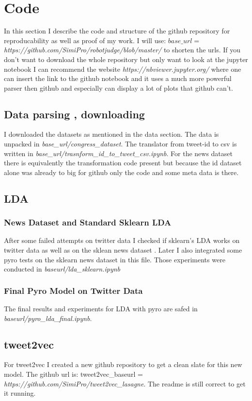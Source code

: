\documentclass[10pt,conference,compsocconf]{IEEEtran}
\begin{document}
\section{Code}
\label{sec:Code}
In this section I describe the code and structure of the github repository for reproducability as well as proof of my work. I will use: $base\_url =$ \textit{https://github.com/SimiPro/robotjudge/blob/master/} to shorten the urls. If you don't want to download the whole repository but only want to look at the jupyter notebook I can recommend the website \textit{https://nbviewer.jupyter.org/} where one can insert the link to the github notebook and it uses a much more powerful parser then github and especially can display a lot of plots that github can't.

\subsection{Data parsing , downloading}
I downloaded the datasets as mentioned in the data section. The data is unpacked in \textit{base\_url/congress\_dataset}. The translator from tweet-id to csv is written in \textit{base\_url/trasnform\_id\_to\_tweet\_csv.ipynb}. For the news dataset there is equivalently the transformation code present but because the id dataset alone was already to big for github only the code and some meta data is there. 

\subsection{LDA}
\subsubsection{News Dataset and Standard Sklearn LDA}
After some failed attempts on twitter data I checked if sklearn's LDA works on twitter data as well as on the sklean news dataset \cite{sklearn_newsdataset}. Later I also integrated some pyro tests on the sklearn news dataset in this file. Those experiments were conducted in \textit{baseurl/lda\_sklearn.ipynb}
\subsubsection{Final Pyro Model on Twitter Data}
The final results and experiments for LDA with pyro are safed in \textit{baseurl/pyro\_lda\_final.ipynb}.

\subsection{tweet2vec}
For tweet2vec I created a new github repository to get a clean slate for this new model. The github url is: tweet2vec\_baseurl = \textit{https://github.com/SimiPro/tweet2vec\_lasagne}. The readme is still correct to get it running.
\end{document}
